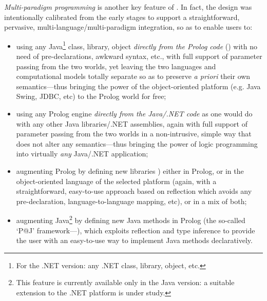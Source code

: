 \textit{Multi-paradigm programming} is another key feature of \tuprolog{}.
%
In fact, the \tuprolog{} design was intentionally calibrated from the early stages to support a straightforward, pervasive, multi-language/multi-paradigm integration, so as to enable users to:
\begin{itemize}
  \item using any Java\footnote{For the .NET version: any .NET class, library, object, etc.} class, library, object \emph{directly from the Prolog code}
  () with no need of pre-declarations, awkward syntax, etc., with full support of parameter passing from the two worlds, yet leaving the two languages and computational models totally separate so as to preserve \emph{a priori} their own semantics---thus bringing the power of the object-oriented platform (e.g. Java Swing, JDBC, etc) to the Prolog world for free;

  \item using any Prolog engine \emph{directly from the Java/.NET code} as one would
   do with any other Java libraries/.NET assemblies, again with full support of parameter passing from the two worlds in a non-intrusive, simple way that does not alter any semantics---thus bringing the power of logic programming into virtually \emph{any} Java/.NET application;

  \item augmenting Prolog by defining new libraries )
  either in Prolog, or in the object-oriented language of the selected platform (again, with a straightforward, easy-to-use approach based on reflection which avoids any pre-declaration, language-to-language mapping, etc), or in a mix of both;

  \item augmenting Java\footnote{This feature is currently available only in the Java version: a suitable extension to the .NET platform is under study.} by defining new Java methods in Prolog (the so-called `P@J' framework---), which exploits reflection and type inference to provide the user with an easy-to-use way to implement Java methods declaratively.
\end{itemize}

